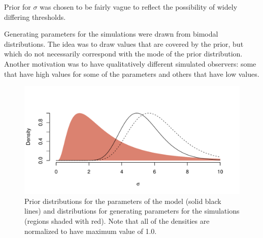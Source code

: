 \documentclass{article}\usepackage{knitr}
\begin{document}
Prior for $\sigma$ was chosen to be fairly vague to reflect the possibility of widely differing thresholds.

Generating parameters for the simulations were drawn from bimodal distributions. The idea was to draw values that are covered by the prior, but which do not necessarily correspond with the mode of the prior distribution. Another motivation was to have qualitatively different simulated observers: some that have high values for some of the parameters and others that have low values.

\begin{figure}[!htb]
\centering
\begin{knitrout}
\color{fgcolor}
\includegraphics[width=\maxwidth]{figure/unnamed-chunk-13-1} 

\end{knitrout}

\caption{Prior distributions for the parameters of the model (solid black lines) and distributions for generating parameters for the simulations (regions shaded with red). Note that all of the densities are normalized to have maximum value of 1.0.}
\label{fig:priors}
\end{figure}
\end{document}
